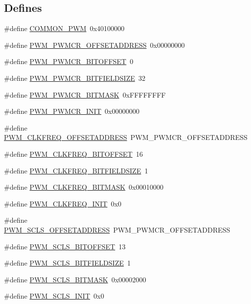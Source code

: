 \subsection*{Defines}
\begin{DoxyCompactItemize}
\item 
\#define \hyperlink{a00565_a8a4ca7fd926356de47ba79c81559f1fc}{COMMON\_\-PWM}~0x40100000
\item 
\#define \hyperlink{a00565_a1ed6898b1ee03d9483ce781f1f851ffb}{PWM\_\-PWMCR\_\-OFFSETADDRESS}~0x00000000
\item 
\#define \hyperlink{a00565_aaff2da63915376887aab580f6fd14619}{PWM\_\-PWMCR\_\-BITOFFSET}~0
\item 
\#define \hyperlink{a00565_a1a7d20fb5029cfe68d3972c012f825ad}{PWM\_\-PWMCR\_\-BITFIELDSIZE}~32
\item 
\#define \hyperlink{a00565_a940279f6cfb5c63c1d33ed7aef1af025}{PWM\_\-PWMCR\_\-BITMASK}~0xFFFFFFFF
\item 
\#define \hyperlink{a00565_a1b649e10a0e7c96070404a2f7e8e06fa}{PWM\_\-PWMCR\_\-INIT}~0x00000000
\item 
\#define \hyperlink{a00565_a9cfc58aa51479fffb2ad13b9d1f2140a}{PWM\_\-CLKFREQ\_\-OFFSETADDRESS}~PWM\_\-PWMCR\_\-OFFSETADDRESS
\item 
\#define \hyperlink{a00565_a5ab3f3c7f2fde6281cf23a776170bde8}{PWM\_\-CLKFREQ\_\-BITOFFSET}~16
\item 
\#define \hyperlink{a00565_a3e40fa7bb96ef0ab41dd6c55a677fd4e}{PWM\_\-CLKFREQ\_\-BITFIELDSIZE}~1
\item 
\#define \hyperlink{a00565_aafb0f88c898bc809c1dedcb764035cdf}{PWM\_\-CLKFREQ\_\-BITMASK}~0x00010000
\item 
\#define \hyperlink{a00565_a8d7b05b8c1963d8dd7500929da1ae824}{PWM\_\-CLKFREQ\_\-INIT}~0x0
\item 
\#define \hyperlink{a00565_a2aa37a1f58aae29ca5c21a3ed714d64c}{PWM\_\-SCLS\_\-OFFSETADDRESS}~PWM\_\-PWMCR\_\-OFFSETADDRESS
\item 
\#define \hyperlink{a00565_a808cf75beac1131f7c35f3a560fdef11}{PWM\_\-SCLS\_\-BITOFFSET}~13
\item 
\#define \hyperlink{a00565_ab2835b9033ec1ff977ed6a335f7d1135}{PWM\_\-SCLS\_\-BITFIELDSIZE}~1
\item 
\#define \hyperlink{a00565_ab7e8fe07d218f5a5de027c01dfae6ee3}{PWM\_\-SCLS\_\-BITMASK}~0x00002000
\item 
\#define \hyperlink{a00565_a06b314cd436f167fc3081a845546b2cc}{PWM\_\-SCLS\_\-INIT}~0x0
\item 

\end{DoxyCompactItemize}
